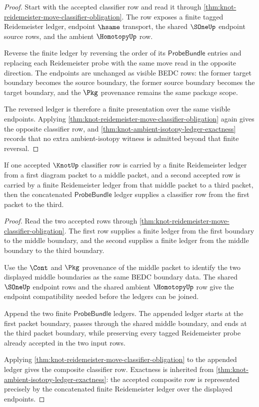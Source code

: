 \begin{proof}
Start with the accepted classifier row and read it through \autoref{thm:knot-reidemeister-move-classifier-obligation}. The row exposes a finite tagged Reidemeister ledger, endpoint $\hsame$ transport, the shared $\SOneUp$ endpoint source rows, and the ambient $\HomotopyUp$ row.

Reverse the finite ledger by reversing the order of its $\mathsf{ProbeBundle}$ entries and replacing each Reidemeister probe with the same move read in the opposite direction. The endpoints are unchanged as visible BEDC rows: the former target boundary becomes the source boundary, the former source boundary becomes the target boundary, and the $\Pkg$ provenance remains the same package scope.

The reversed ledger is therefore a finite presentation over the same visible endpoints. Applying \autoref{thm:knot-reidemeister-move-classifier-obligation} again gives the opposite classifier row, and \autoref{thm:knot-ambient-isotopy-ledger-exactness} records that no extra ambient-isotopy witness is admitted beyond that finite reversal.
\end{proof}

\begin{theorem}\label{thm:knot-reidemeister-concat-ledger-transitivity}
If one accepted $\KnotUp$ classifier row is carried by a finite Reidemeister ledger from a first diagram packet to a middle packet, and a second accepted row is carried by a finite Reidemeister ledger from that middle packet to a third packet, then the concatenated $\mathsf{ProbeBundle}$ ledger supplies a classifier row from the first packet to the third.
\end{theorem}

\begin{proof}
Read the two accepted rows through \autoref{thm:knot-reidemeister-move-classifier-obligation}. The first row supplies a finite ledger from the first boundary to the middle boundary, and the second supplies a finite ledger from the middle boundary to the third boundary.

Use the $\Cont$ and $\Pkg$ provenance of the middle packet to identify the two displayed middle boundaries as the same BEDC boundary data. The shared $\SOneUp$ endpoint rows and the shared ambient $\HomotopyUp$ row give the endpoint compatibility needed before the ledgers can be joined.

Append the two finite $\mathsf{ProbeBundle}$ ledgers. The appended ledger starts at the first packet boundary, passes through the shared middle boundary, and ends at the third packet boundary, while preserving every tagged Reidemeister probe already accepted in the two input rows.

Applying \autoref{thm:knot-reidemeister-move-classifier-obligation} to the appended ledger gives the composite classifier row. Exactness is inherited from \autoref{thm:knot-ambient-isotopy-ledger-exactness}: the accepted composite row is represented precisely by the concatenated finite Reidemeister ledger over the displayed endpoints.
\end{proof}

